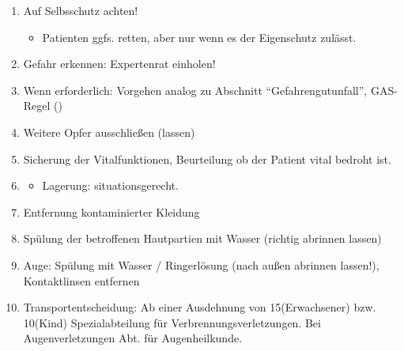 \label{m:chemische-verletzungen}
\begin{enumerate}
  \item Auf Selbsschutz achten!
  \begin{itemize}
    \item Patienten ggfs. retten, aber nur wenn es der
    Eigenschutz zulässt.
  \end{itemize}
  \item Gefahr erkennen:   Expertenrat einholen!
  \item Wenn erforderlich: Vorgehen analog zu Abschnitt
  \enquote{Gefahrengutunfall}, GAS-Regel
  ()
  \item Weitere Opfer ausschließen (lassen)
  \item Sicherung der Vitalfunktionen, Beurteilung ob der
  Patient vital bedroht ist.
  \item \TxBeiVit \TxMassVitMKBes
  \begin{itemize}
    \item Lagerung: situationsgerecht.
  \end{itemize}
  \item Entfernung kontaminierter Kleidung
  \item Spülung der betroffenen Hautpartien mit Wasser  (richtig abrinnen
  lassen)
  \item Auge: Spülung mit Wasser / Ringerlösung (nach außen abrinnen
  lassen!),  Kontaktlinsen entfernen
  \item Transportentscheidung: Ab einer Ausdehnung von
  15\PC* (Erwachsener) bzw. 10\PC* (Kind) Spezialabteilung
  für Verbrennungsverletzungen. Bei Augenverletzungen Abt.
  für Augenheilkunde.
\end{enumerate}
